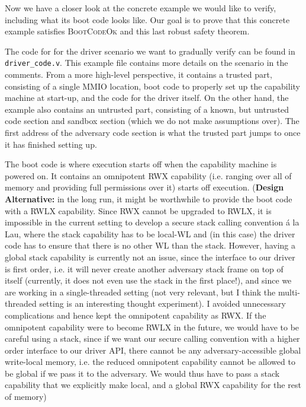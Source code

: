 \documentclass{article}
\newcommand{\T}[1]{\texttt{#1}}
\begin{document}
Now we have a closer look at the concrete example we would like to verify,
including what its boot code looks like. Our goal is to prove that this concrete
example satisfies \textsc{BootCodeOk} and this last robust safety theorem.

The code for for the driver scenario we want to gradually verify can
be found in \T{driver\_code.v}. This example file contains more details on the
scenario in the comments. From a more high-level perspective, it contains a
trusted part, consisting of a single MMIO location, boot code to properly set up
the capability machine at start-up, and the code for the driver itself. On the
other hand, the example also contains an untrusted part, consisting of a known,
but untrusted code section and sandbox section (which we do not make assumptions
over).
The first address of the adversary code section is what the trusted part jumps
to once it has finished setting up.

The boot code is where execution starts off when the capability machine is
powered on.
It contains an omnipotent RWX capability (i.e. ranging over all of memory and
providing full permissions over it) starts off execution.
(\textbf{Design Alternative:} in the long run, it might be worthwhile to provide
the boot code with a RWLX capability. Since RWX cannot be upgraded to RWLX, it
is impossible in the current setting to develop a secure stack calling
convention \'a la Lau, where the stack capability has to be local-WL and (in this
case) the driver code has to ensure that there is no other WL than the stack.
However, having a global stack capability is currently not an issue, since the interface to our driver is first order, i.e. it will
never create another adversary stack frame on top of itself (currently, it does
not even use the stack in the first place!), and since we are working in a
single-threaded setting (not very relevant, but I think the multi-threaded
setting is an interesting thought experiment). I avoided unnecessary
complications and hence kept the omnipotent capability as RWX. If the omnipotent
capability were to become RWLX in the future, we would have to be careful using
a stack, since if we want our secure calling convention with a higher order
interface to our driver API, there cannot be any adversary-accessible global
write-local memory, i.e. the reduced omnipotent capability cannot be allowed to be global if we pass it to the adversary. We would thus have to pass a stack capability that we explicitly make local, and a global RWX capability for the rest of memory)
\end{document}
